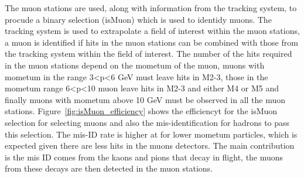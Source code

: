 The muon stations are used, along with information from the tracking system, to procude a binary selection (isMuon) which is used to identidy muons. The tracking system is used to extrapolate a field of interest within the muon stations, a muon is identified if hits in the muon stations can be combined with those from the tracking system within the field of interest. The number of the hits required in the muon stations depend on the mometum of the muon, muons with mometum in the range 3<p<6 GeV must leave hits in M2-3, those in the  mometum range 6<p<10 muon leave hits in M2-3 and either M4 or M5 and finally muons with mometum above 10 GeV must be observed in all the muon stations. Figure~\ref{fig:isMuon_efficiency} shows the efficiencyt for the isMuon selection for selecting muons and also the mis-identification for hadrons to pass this selection. The mis-ID rate is higher at for lower mometum particles, which is expected given there are less hits in the muons detectors. The main contribution is the mis ID comes from the kaons and pions that decay in flight, the  muons from these decays are then detected in the muon stations.


